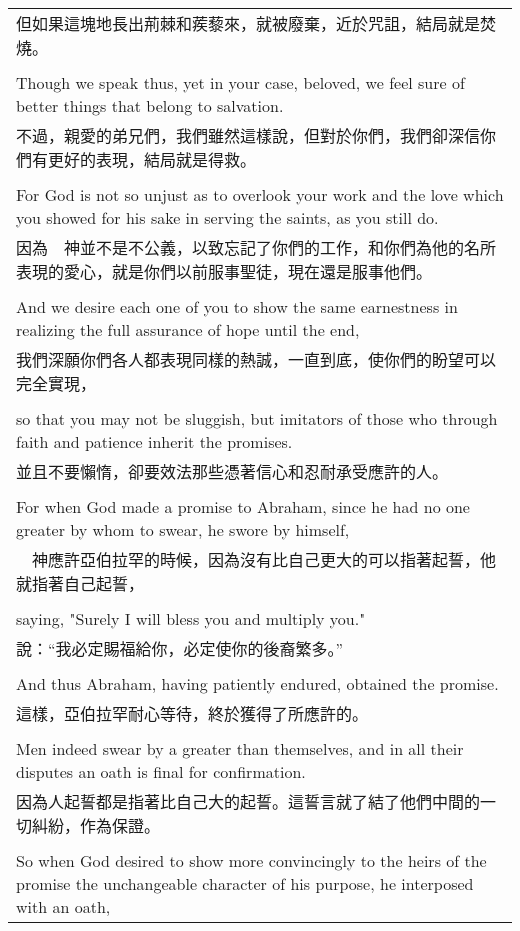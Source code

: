 \documentclass{book}
\begin{document}
\begin{tabularx}{\textwidth}{p{}}
但如果這塊地長出荊棘和蒺藜來，就被廢棄，近於咒詛，結局就是焚燒。 \\ \\
Though we speak thus, yet in your case, beloved, we feel sure of better things that belong to salvation. \\
不過，親愛的弟兄們，我們雖然這樣說，但對於你們，我們卻深信你們有更好的表現，結局就是得救。 \\ \\
For God is not so unjust as to overlook your work and the love which you showed for his sake in serving the saints, as you still do. \\
因為　神並不是不公義，以致忘記了你們的工作，和你們為他的名所表現的愛心，就是你們以前服事聖徒，現在還是服事他們。 \\ \\
And we desire each one of you to show the same earnestness in realizing the full assurance of hope until the end, \\
我們深願你們各人都表現同樣的熱誠，一直到底，使你們的盼望可以完全實現， \\ \\
so that you may not be sluggish, but imitators of those who through faith and patience inherit the promises. \\
並且不要懶惰，卻要效法那些憑著信心和忍耐承受應許的人。 \\ \\
For when God made a promise to Abraham, since he had no one greater by whom to swear, he swore by himself, \\
　神應許亞伯拉罕的時候，因為沒有比自己更大的可以指著起誓，他就指著自己起誓， \\ \\
saying, "Surely I will bless you and multiply you." \\
說：“我必定賜福給你，必定使你的後裔繁多。” \\ \\
And thus Abraham, having patiently endured, obtained the promise. \\
這樣，亞伯拉罕耐心等待，終於獲得了所應許的。 \\ \\
Men indeed swear by a greater than themselves, and in all their disputes an oath is final for confirmation. \\
因為人起誓都是指著比自己大的起誓。這誓言就了結了他們中間的一切糾紛，作為保證。 \\ \\
So when God desired to show more convincingly to the heirs of the promise the unchangeable character of his purpose, he interposed with an oath, \\

\end{tabularx}
\end{document}
